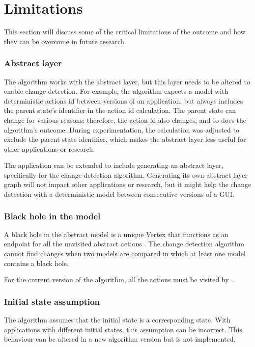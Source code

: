 \section{Limitations}
This section will discuss some of the critical limitations of the outcome and how they can be overcome in future research. 

\subsubsection{Abstract layer}
The algorithm works with the abstract layer, but this layer needs to be altered to enable change detection. For example, the algorithm expects a model with deterministic actions id between versions of an application, but \testar always includes the parent state's identifier in the action id calculation. The parent state can change for various reasons; therefore, the action id also changes, and so does the algorithm's outcome. During experimentation, the calculation was adjusted to exclude the parent state identifier, which makes the abstract layer less useful for other applications or research.

The application can be extended to include generating an abstract layer, specifically for the change detection algorithm. Generating its own abstract layer graph will not impact other applications or research, but it might help the change detection with a deterministic model between consecutive versions of a GUI. 

\subsubsection{Black hole in the model}
A black hole in the \testar abstract model is a unique Vertex that functions as an endpoint for all the unvisited abstract actions \cite{mulders2022Statemodel}. The change detection algorithm cannot find changes when two models are compared in which at least one model contains a black hole.

For the current version of the algorithm, all the actions must be visited by \testar.

\subsubsection{Initial state assumption}
The algorithm assumes that the initial state is a corresponding state. With applications with different initial states, this assumption can be incorrect. This behaviour can be altered in a new algorithm version but is not implemented. 


